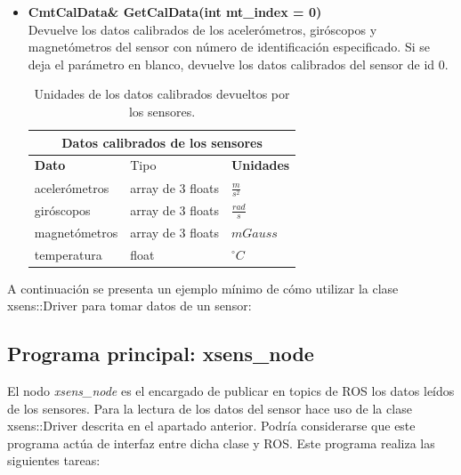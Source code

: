 \documentclass[12pt, a4paper]{report}
\begin{document}
\begin{itemize}
\begin{itemize}
		\item \textbf{CmtCalData\& GetCalData(int mt\_index = 0)}\\
		Devuelve los datos calibrados de los acelerómetros, giróscopos y magnetómetros del sensor con número de identificación especificado. Si se deja el parámetro en blanco, devuelve los datos calibrados del sensor de id 0.	

\begin{table}[h]
\center
\begin{tabular}{|l|l|l|}
\hline
\multicolumn{3}{|c|}{\textbf{Datos calibrados de los sensores}}\\
\hline
\textbf{Dato} & Tipo & \textbf{Unidades} \\ 
\hline
acelerómetros & array de 3 floats & $\displaystyle\frac{m}{s^2}$ \\
giróscopos & array de 3 floats & $\displaystyle\frac{rad}{s}$ \\
magnetómetros & array de 3 floats & $mGauss$ \\
temperatura & float & $^\circ C$ \\
\hline
\end{tabular}	
\caption[Unidades de los datos calibrados devueltos por los sensores]{Unidades de los datos calibrados devueltos por los sensores.}
\label{tab:sensor_units}	
\end{table}		
			
	\end{itemize}

\end{itemize}

A continuación se presenta un ejemplo mínimo de cómo utilizar la clase xsens::Driver para tomar datos de un sensor:

\lstset{inputencoding=utf8/latin1}



\subsection{Programa principal: xsens\_node}

El nodo \textit{xsens\_node} es el encargado de publicar en topics de ROS los datos leídos de los sensores. Para la lectura de los datos del sensor hace uso de la clase xsens::Driver descrita en el apartado anterior. Podría considerarse que este programa actúa de interfaz entre dicha clase y ROS. Este programa realiza las siguientes tareas:
\end{document}
